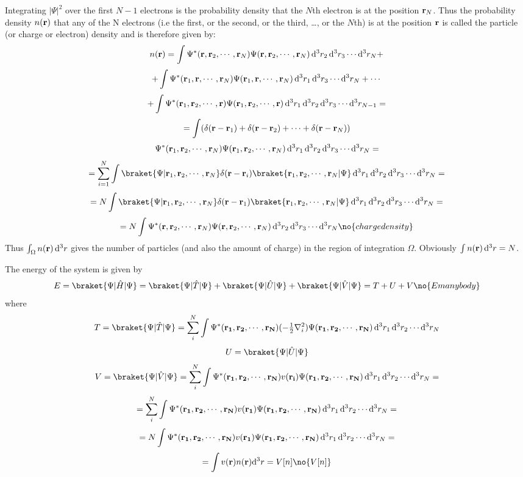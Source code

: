 Integrating $|\Psi|^2$ over the first $N-1$ electrons is the probability
density that the $N$th electron is at the position ${\bf r}_N$.  Thus the
probability density $n({\bf r})$ that any of the N electrons (i.e the first, or
the second, or the third, \dots, or the $N$th) is at the position $\bf r$ is
called the particle (or charge or electron) density and is therefore given by:
$$n({\bf r})= \int
\Psi^*({\bf r},{\bf r}_2,\cdots,{\bf r}_N)
\Psi  ({\bf r},{\bf r}_2,\cdots,{\bf r}_N)
\,{\rm d}^3 r_2\,{\rm d}^3 r_3\cdots{\rm d}^3 r_N+ $$
$$+\int
\Psi^*({\bf r}_1,{\bf r},\cdots,{\bf r}_N)
\Psi  ({\bf r}_1,{\bf r},\cdots,{\bf r}_N)
\,{\rm d}^3 r_1\,{\rm d}^3 r_3\cdots{\rm d}^3 r_N+\cdots$$
$$+\int
\Psi^*({\bf r}_1,{\bf r}_2,\cdots,{\bf r})
\Psi  ({\bf r}_1,{\bf r}_2,\cdots,{\bf r})
\,{\rm d}^3 r_1\,{\rm d}^3 r_2\,{\rm d}^3 r_3\cdots{\rm d}^3 r_{N-1}=$$
$$=\int(\delta({\bf r}-{\bf r}_1)+\delta({\bf r}-{\bf
r}_2)+\cdots+\delta({\bf r}-{\bf r}_N))$$
$$
\Psi^*({\bf r}_1,{\bf r}_2,\cdots,{\bf r}_N)
\Psi  ({\bf r}_1,{\bf r}_2,\cdots,{\bf r}_N)
\,{\rm d}^3 r_1\,{\rm d}^3 r_2\,{\rm d}^3 r_3\cdots{\rm d}^3 r_{N}=$$
$$=\sum_{i=1}^N\int
\braket{\Psi|{\bf r}_1,{\bf r}_2,\cdots,{\bf r}_N}\delta({\bf r}-{\bf r}_i)
\braket{{\bf r}_1,{\bf r}_2,\cdots,{\bf r}_N|\Psi}
\,\d^3 r_1\,\d^3 r_2\,\d^3 r_3\cdots\d^3 r_{N}=$$
$$=N\int
\braket{\Psi|{\bf r}_1,{\bf r}_2,\cdots,{\bf r}_N}\delta({\bf r}-{\bf r}_1)
\braket{{\bf r}_1,{\bf r}_2,\cdots,{\bf r}_N|\Psi}
\,\d^3 r_1\,\d^3 r_2\,\d^3 r_3\cdots\d^3 r_{N}=$$
$$=N\int
\Psi^*({\bf r},{\bf r}_2,\cdots,{\bf r}_N)
\Psi  ({\bf r},{\bf r}_2,\cdots,{\bf r}_N)
\,\d^3 r_2\,\d^3 r_3\cdots\d^3 r_N\no{chargedensity}$$
Thus $\int_\Omega n({\bf r})\,{\rm d}^3r$ gives the number of particles (and also the
amount of charge) in the region of integration $\Omega$. Obviously 
$\int n({\bf r})\,{\rm d}^3r=N$.


The energy of the system is given by
$$E=\braket{\Psi|\hat H|\Psi}=
\braket{\Psi|\hat T|\Psi}+\braket{\Psi|\hat U|\Psi}+\braket{\Psi|\hat V|\Psi}=
T+U+V\no{Emanybody}$$
where 
$$T=\braket{\Psi|\hat T|\Psi}=\sum_i^N\int
\Psi^*({\bf r_1},{\bf r_2},\cdots,{\bf r_N})(-\half\nabla_i^2)
\Psi({\bf r_1},{\bf r_2},\cdots,{\bf r_N})\,\d^3 r_1\,\d^3 r_2\cdots\d^3 r_N
$$
$$U=\braket{\Psi|\hat U|\Psi}$$
$$V=\braket{\Psi|\hat V|\Psi}=\sum_i^N\int
\Psi^*({\bf r_1},{\bf r_2},\cdots,{\bf r_N})v({\bf r_i})
\Psi({\bf r_1},{\bf r_2},\cdots,{\bf r_N})\,\d^3 r_1\,\d^3 r_2\cdots\d^3 r_N=
$$
$$=\sum_i^N\int
\Psi^*({\bf r_1},{\bf r_2},\cdots,{\bf r_N})v({\bf r_1})
\Psi({\bf r_1},{\bf r_2},\cdots,{\bf r_N})\,{\rm d}^3 r_1\,{\rm d}^3 r_2\cdots{\rm d}^3 r_N=
$$
$$=N\int
\Psi^*({\bf r_1},{\bf r_2},\cdots,{\bf r_N})v({\bf r_1})
\Psi({\bf r_1},{\bf r_2},\cdots,{\bf r_N})\,{\rm d}^3 r_1\,{\rm d}^3 r_2\cdots{\rm d}^3 r_N=
$$
$$=\int v({\bf r}) n({\bf r})\d^3 r=V[n]\no{V[n]}$$

